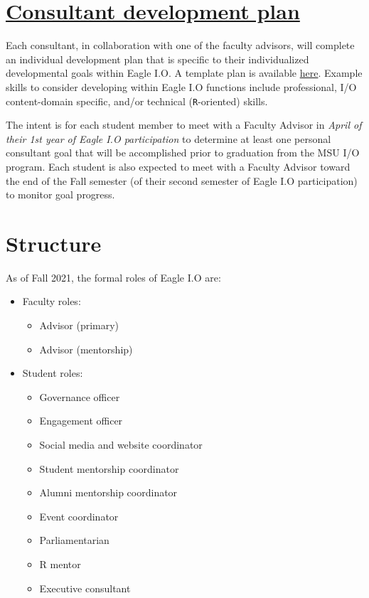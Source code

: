 \documentclass[
]{book}
\providecommand{\tightlist}{%
  \setlength{\itemsep}{0pt}\setlength{\parskip}{0pt}}
\begin{document}
\hypertarget{consultant-development-plan}{%
\section{\texorpdfstring{\href{https://docs.google.com/document/d/13OhBJgO4Lr40uA9s3tLBTm17TNRrQa-NJnfTIbSGmT4/edit?usp=sharing}{Consultant development plan}}{Consultant development plan}}\label{consultant-development-plan}}

Each consultant, in collaboration with one of the faculty advisors, will complete an individual development plan that is specific to their individualized developmental goals within Eagle I.O. A template plan is available \href{https://docs.google.com/document/d/13OhBJgO4Lr40uA9s3tLBTm17TNRrQa-NJnfTIbSGmT4/edit?usp=sharing}{here}. Example skills to consider developing within Eagle I.O functions include professional, I/O content-domain specific, and/or technical (\texttt{R}-oriented) skills.

The intent is for each student member to meet with a Faculty Advisor in \emph{April of their 1st year of Eagle I.O participation} to determine at least one personal consultant goal that will be accomplished prior to graduation from the MSU I/O program. Each student is also expected to meet with a Faculty Advisor toward the end of the Fall semester (of their second semester of Eagle I.O participation) to monitor goal progress.

\hypertarget{roles}{%
\section{Structure}\label{roles}}

As of Fall 2021, the formal roles of Eagle I.O are:

\begin{itemize}
\tightlist
\item
  Faculty roles:

  \begin{itemize}
  \tightlist
  \item
    Advisor (primary)
  \item
    Advisor (mentorship)
  \end{itemize}
\item
  Student roles:

  \begin{itemize}
  \tightlist
  \item
    Governance officer
  \item
    Engagement officer
  \item
    Social media and website coordinator
  \item
    Student mentorship coordinator
  \item
    Alumni mentorship coordinator\\
  \item
    Event coordinator
  \item
    Parliamentarian
  \item
    R mentor
  \item
    Executive consultant
  \end{itemize}
\end{itemize}
\end{document}
